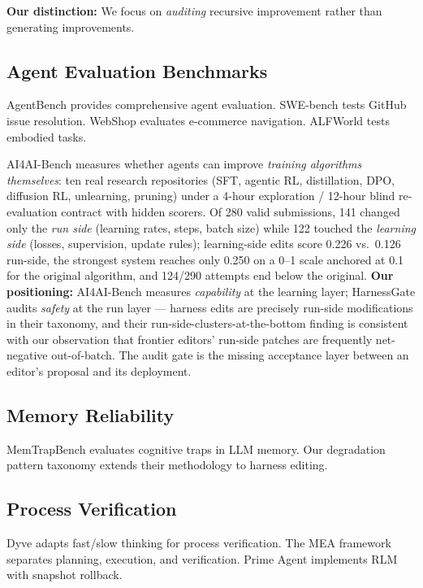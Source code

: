 \documentclass{article}
\begin{document}
\textbf{Our distinction:} We focus on \emph{auditing} recursive improvement rather than generating improvements.

\subsection{Agent Evaluation Benchmarks}
AgentBench \citep{liu2023agentbench} provides comprehensive agent evaluation. SWE-bench \citep{jimenez2024swebench} tests GitHub issue resolution. WebShop \citep{zhao2023webshop} evaluates e-commerce navigation. ALFWorld \citep{warrier2022alfworld} tests embodied tasks.

AI4AI-Bench \citep{chi2026ai4aibench} measures whether agents can improve \emph{training algorithms themselves}: ten real research repositories (SFT, agentic RL, distillation, DPO, diffusion RL, unlearning, pruning) under a 4-hour exploration / 12-hour blind re-evaluation contract with hidden scorers. Of 280 valid submissions, 141 changed only the \emph{run side} (learning rates, steps, batch size) while 122 touched the \emph{learning side} (losses, supervision, update rules); learning-side edits score 0.226 vs.\ 0.126 run-side, the strongest system reaches only 0.250 on a 0--1 scale anchored at 0.1 for the original algorithm, and 124/290 attempts end below the original. \textbf{Our positioning:} AI4AI-Bench measures \emph{capability} at the learning layer; HarnessGate audits \emph{safety} at the run layer --- harness edits are precisely run-side modifications in their taxonomy, and their run-side-clusters-at-the-bottom finding is consistent with our observation that frontier editors' run-side patches are frequently net-negative out-of-batch. The audit gate is the missing acceptance layer between an editor's proposal and its deployment.

\subsection{Memory Reliability}
MemTrapBench \citep{wang2026memtrapbench} evaluates cognitive traps in LLM memory. Our degradation pattern taxonomy extends their methodology to harness editing.

\subsection{Process Verification}
Dyve \citep{zhong2026dyve} adapts fast/slow thinking for process verification. The MEA framework separates planning, execution, and verification. Prime Agent \citep{primeintellect2026primeagent} implements RLM with snapshot rollback.
\end{document}
